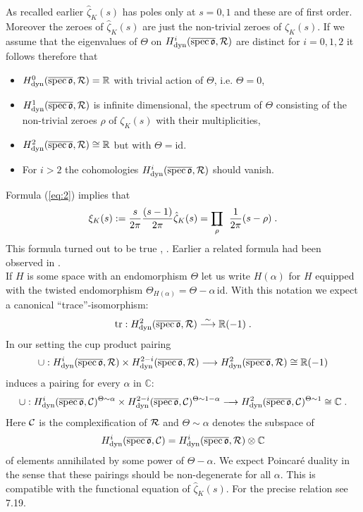 \documentclass[11pt,leqno]{article}
\newcommand{\C}{{\mathbb{C}}}
\newcommand{\R}{{\mathbb{R}}}
\newcommand{\id}{\mathrm{id}}
\newcommand{\dyn}{\mathrm{dyn}}
\newcommand{\spec}{\mathrm{spec}\,}
\newcommand{\tr}{\mathrm{tr}}
\newcommand{\Ch}{{\cal C}}
\newcommand{\Rh}{{\cal R}}
\newcommand{\eo}{\mathfrak{o}}
\newcommand{\silo}{\stackrel{\sim}{\longrightarrow}}
\newcommand{\Rpp}[2]{\prod_{#1}^{#2} \hspace{-4mm} {\rule[-4pt]{2.5mm}{0.2mm}} \hspace{3mm}}
\begin{document}
As recalled earlier $\hat{\zeta}_K (s)$ has poles only at $s = 0,1$ and these are of first order. Moreover the zeroes of $\hat{\zeta}_K (s)$ are just the
non-trivial zeroes of $\zeta_K (s)$. If we assume that the eigenvalues
of $\Theta$ on $H^i_{\dyn} ( \overline{\spec \eo}  , \Rh)$ are distinct
for $i = 0 , 1 , 2$ it follows therefore that
\begin{itemize}
\item $H^0_{\dyn} ( \overline{\spec \eo}  , \Rh) = \R$ with trivial action of $\Theta$, i.e. $\Theta = 0$,
\item $H^1_{\dyn} ( \overline{\spec \eo}  , \Rh)$ is infinite dimensional, the spectrum of $\Theta$ consisting of the non-trivial zeroes $\rho$ of $\zeta_K (s)$ with their multiplicities,
\item $H^2_{\dyn} ( \overline{\spec \eo}  , \Rh) \cong \R$ but with $\Theta = \id$.
\item For $i > 2$ the cohomologies $H^i_{\dyn} ( \overline{\spec \eo}  , \Rh)$ should vanish.
\end{itemize}
Formula (\ref{eq:2}) implies that
\[
\xi_K (s) := \frac{s}{2 \pi} \frac{(s-1)}{2 \pi} \hat{\zeta}_K (s) = \Rpp{\rho}{} \frac{1}{2\pi} (s-\rho) \; .
\]
This formula turned out to be true \cite{D2}, \cite{SchS}. Earlier a related formula had been observed in \cite{K}. \\
If $H$ is some space with an endomorphism $\Theta$ let us write $H (\alpha)$ for $H$ equipped with the twisted endomorphism $\Theta_{H (\alpha)} = \Theta - \alpha \, \id$. With this notation we expect a canonical ``trace''-isomorphism:
\[
\tr : H^2_{\dyn} ( \overline{\spec \eo}  , \Rh) \silo \R (-1) \; .
\]
In our setting the cup product pairing
\[
\cup : H^i_{\dyn} ( \overline{\spec \eo}  , \Rh) \times H^{2-i}_{\dyn} ( \overline{\spec \eo}  , \Rh) \longrightarrow H^2_{\dyn} ( \overline{\spec \eo}  , \Rh) \cong \R (-1)
\]
induces a pairing for every $\alpha$ in $\C$:
\[
{\small \cup : H^i_{\dyn} ( \overline{\spec \eo}  , \Ch)^{\Theta \sim \alpha} \times H^{2-i}_{\dyn} ( \overline{\spec \eo}  , \Ch)^{\Theta \sim 1-\alpha} \longrightarrow H^2_{\dyn} ( \overline{\spec \eo}  , \Ch)^{\Theta \sim 1} \cong \C \; .}
\]
Here $\Ch$ is the complexification of $\Rh$ and $\Theta \sim \alpha$ denotes the subspace of
\[
H^i_{\dyn} ( \overline{\spec \eo}  , \Ch) = H^i_{\dyn} ( \overline{\spec \eo}  , \Rh) \otimes \C
\]
of elements annihilated by some power of $\Theta - \alpha$. We expect Poincar\'e duality in the sense that these pairings should be non-degenerate for all $\alpha$. This is compatible with the functional equation of $\hat{\zeta}_K (s)$. For the precise relation see \cite{D6} 7.19.\\
\end{document}
